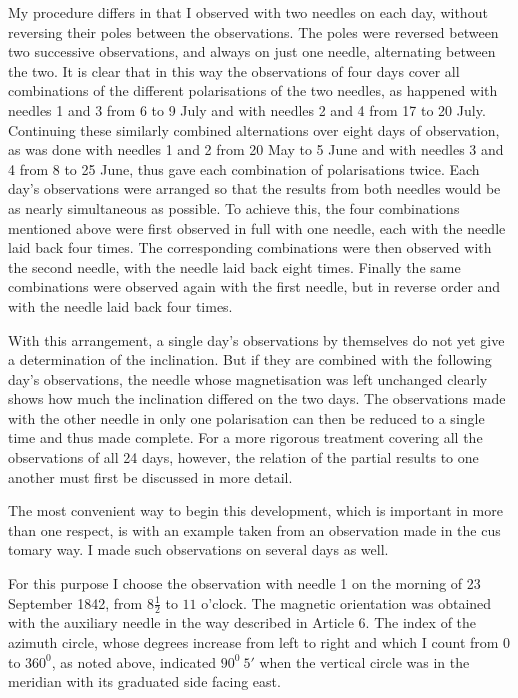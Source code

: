 My procedure differs in that I observed with two needles on each day, without reversing their poles between the observations. The poles were reversed between two successive observations, and always on just one needle, alternating between the two. It is clear that in this way the observations of four days cover all combinations of the different polarisations of the two needles, as happened with needles 1 and 3 from 6 to 9 July and with needles 2 and 4 from 17 to 20 July. Continuing these similarly combined alternations over eight days of observation, as was done with needles 1 and 2 from 20 May to 5 June and with needles 3 and 4 from 8 to 25 June, thus gave each combination of polarisations twice. Each day's observations were arranged so that the results from both needles would be as nearly simultaneous as possible. To achieve this, the four combinations mentioned above were first observed in full with one needle, each with the needle laid back four times. The corresponding combinations were then observed with the second needle, with the needle laid back eight times. Finally the same combinations were observed again with the first needle, but in reverse order and with the needle laid back four times.

With this arrangement, a single day's observations by themselves do not yet give a determination of the inclination. But if they are combined with the following day's observations, the needle whose magnetisation was left unchanged clearly shows how much the inclination differed on the two days. The observations made with the other needle in only one polarisation can then be reduced to a single time and thus made complete. For a more rigorous treatment covering all the observations of all 24 days, however, the relation of the partial results to one another must first be discussed in more detail.

The most convenient way to begin this development, which is important in more than one respect, is with an example taken from an observation made in the cus%
%
tomary way. I made such observations on several days as well.

For this purpose I choose the observation with needle 1 on the morning of 23 September 1842, from $8\frac{1}{2}$ to $11$ o'clock. The magnetic orientation was obtained with the auxiliary needle in the way described in Article 6. The index of the azimuth circle, whose degrees increase from left to right and which I count from $0$ to $360^0$, as noted above, indicated $90^0\ 5'$ when the vertical circle was in the meridian with its graduated side facing east.

